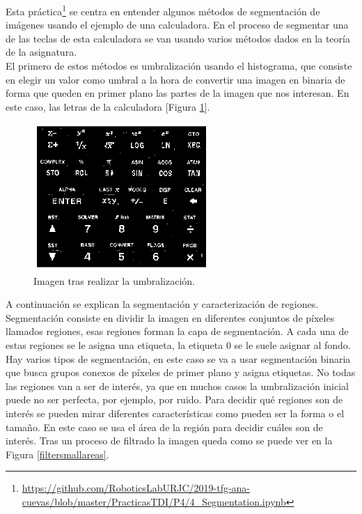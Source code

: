 Esta práctica\footnote{\url{https://github.com/RoboticsLabURJC/2019-tfg-ana-cuevas/blob/master/PracticasTDI/P4/4_Segmentation.ipynb}} se centra en entender algunos métodos de segmentación de imágenes usando el ejemplo de una calculadora. En el proceso de segmentar una de las teclas de esta calculadora se van usando varios métodos dados en la teoría de la asignatura.\\

El primero de estos métodos es umbralización usando el histograma, que consiste en elegir un valor como umbral a la hora de convertir una imagen en binaria de forma que queden en primer plano las partes de la imagen que nos interesan. En este caso, las letras de la calculadora [Figura \ref{thresholding}].\\

\begin{figure}[h]
\centering
\includegraphics[width=0.6\textwidth]{imagenes/thresholding}
\caption{Imagen tras realizar la umbralización.}
\label{thresholding}
\end{figure}
A continuación se explican la segmentación y caracterización de regiones. Segmentación consiste en dividir la imagen en diferentes conjuntos de píxeles llamados regiones, esas regiones forman la capa de segmentación. A cada una de estas regiones se le asigna una etiqueta, la etiqueta 0 se le suele asignar al fondo.\\

Hay varios tipos de segmentación, en este caso se va a usar segmentación binaria que busca grupos conexos de píxeles de primer plano y asigna etiquetas. No todas las regiones van a ser de interés, ya que en muchos casos la umbralización inicial puede no ser perfecta, por ejemplo, por ruido. Para decidir qué regiones son de interés se pueden mirar diferentes características como pueden ser la forma o el tamaño. En este caso se usa el área de la región para decidir cuáles son de interés. Tras un proceso de filtrado la imagen queda como se puede ver en la Figura \ref{filtersmallareas}.\\


